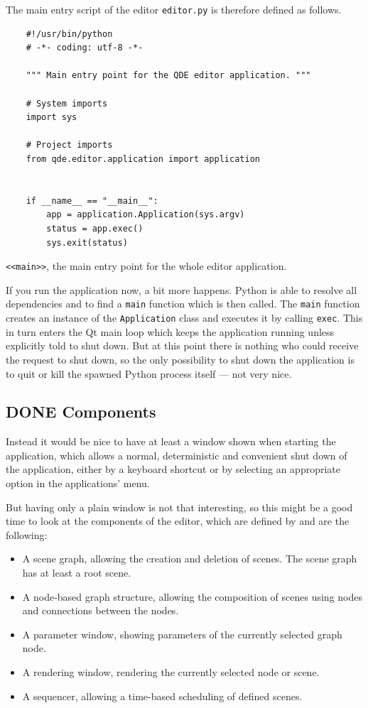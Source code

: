 \documentclass[10pt, openright, notitlepage]{scrreprt}
\begin{document}
The main entry script of the editor \texttt{editor.py} is therefore defined as follows.

\begin{listing}[H]
\begin{verbatim}
    #!/usr/bin/python
    # -*- coding: utf-8 -*-
    
    """ Main entry point for the QDE editor application. """
    
    # System imports
    import sys
    
    # Project imports
    from qde.editor.application import application
    
    
    if __name__ == "__main__":
        app = application.Application(sys.argv)
        status = app.exec()
        sys.exit(status)
\end{verbatim}
\caption{\label{main}
\texttt{<<main>>}, the main entry point for the whole editor application.}
\end{listing}

If you run the application now, a bit more happens. Python is able to
resolve all dependencies and to find a \texttt{main} function which is then called.
The \texttt{main} function creates an instance of the \texttt{Application} class and executes
it by calling \texttt{exec}. This in turn enters the Qt main loop which keeps the
application running unless explicitly told to shut down. But at this point there
is nothing who could receive the request to shut down, so the only possibility
to shut down the application is to quit or kill the spawned Python process
itself --- not very nice.
\subsection{{\bfseries\sffamily DONE} Components}
\label{sec:components}
Instead it would be nice to have at least a window shown when starting the
application, which allows a normal, deterministic and convenient shut down of
the application, either by a keyboard shortcut or by selecting an appropriate
option in the applications' menu.

But having only a plain window is not that interesting, so this might be a good
time to look at the components of the editor, which are defined by
\citep[p. 29 ff.]{osterwalder_qde_2016} and are the following:

\begin{itemize}
\item A scene graph, allowing the creation and deletion of scenes. The scene graph
has at least a root scene.
\item A node-based graph structure, allowing the composition of scenes using nodes
and connections between the nodes.
\item A parameter window, showing parameters of the currently selected graph node.
\item A rendering window, rendering the currently selected node or scene.
\item A sequencer, allowing a time-based scheduling of defined scenes.
\end{itemize}
\end{document}
